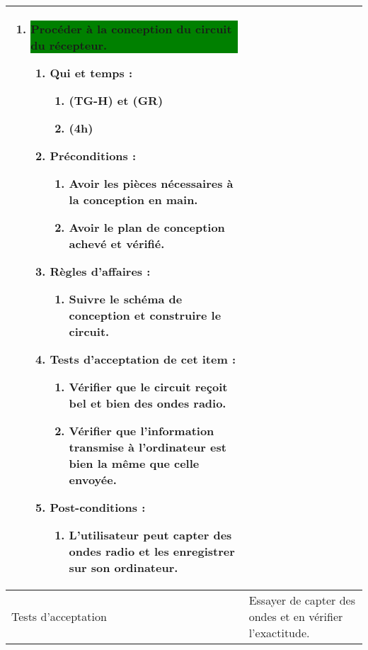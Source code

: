 \begin{longtable}{|l|p{}|}
\begin{enumerate}[label*=\arabic*.]
\begin{enumerate}[label*=\arabic*.]
\begin{enumerate}[label*=\arabic*.]
                    \end{enumerate}
                \end{enumerate}
            \item \colorbox{Green}{\parbox{13cm}{ Procéder à la conception du circuit du récepteur.}}
                \begin{enumerate}[label*=\arabic*.]
                    \item Qui et temps :
                    \begin{enumerate}[label*=\arabic*.]
                        \item (TG-H) et (GR)
                        \item (4h)
                    \end{enumerate}
                    \item Préconditions : 
                    \begin{enumerate}[label*=\arabic*.]
                        \item Avoir les pièces nécessaires à la conception en main.
                        \item Avoir le plan de conception achevé et vérifié.
                    \end{enumerate}
                    \item Règles d’affaires :
                    \begin{enumerate}[label*=\arabic*.]
                        \item Suivre le schéma de conception et construire le circuit.
                    \end{enumerate}
                    \item Tests d'acceptation de cet item :
                    \begin{enumerate}[label*=\arabic*.]
                        \item Vérifier que le circuit reçoit bel et bien des ondes radio.
                        \item Vérifier que l'information transmise à l'ordinateur est bien la même que celle envoyée.
                    \end{enumerate}
                    \item Post-conditions :
                    \begin{enumerate}[label*=\arabic*.]
                        \item L'utilisateur peut capter des ondes radio et les enregistrer sur son ordinateur.
                    \end{enumerate}
                \end{enumerate}
        \end{enumerate} \\
\hline
    Tests d'acceptation & Essayer de capter des ondes et en vérifier l'exactitude. \\


\end{longtable}
